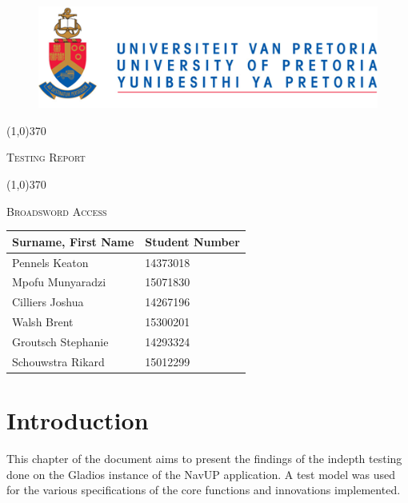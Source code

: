 \documentclass[english]{article}
\begin{document}
	
	\begin{figure}
		\includegraphics[width=\linewidth]{up_logo.png}
	\end{figure}
	
	\begin{center}
	 \line(1,0){370}
	\\[0.2cm]
    {\scshape\Large Testing Report  \par}
	\vspace{0.1cm}
	\line(1,0){370}
	\\[0.8cm]
	
	 {\scshape\Large Broadsword Access \par}
	\vspace{0.9cm}
	
	\begin{tabu} to \textwidth { X[l] X[l]}
		\hline
		\textbf{Surname, First Name  }	& \textbf{Student Number}	\\ \hline \hline
		Pennels 	Keaton   &14373018	\\ \hline
		Mpofu	Munyaradzi   &15071830		\\ \hline
		Cilliers	Joshua   &14267196		\\ \hline
		Walsh     Brent    &15300201		\\ \hline
		Groutsch	Stephanie    &14293324		\\ \hline
		Schouwstra	Rikard    &15012299		\\ \hline
		\hline
	\end{tabu}
	
	\end{center}
	
	
	\newpage
	\tableofcontents

	\newpage
	
	\section{Introduction}

				This chapter of the document aims to present the findings of the indepth testing done on the Gladios instance of the NavUP application. A test model was used for the various specifications of the core functions and innovations implemented.
\end{document}
